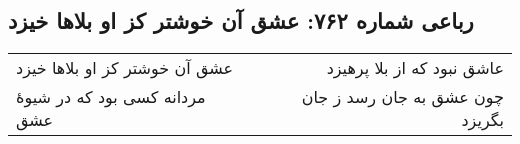 \begin{center}
\section*{رباعی شماره ۷۶۲: عشق آن خوشتر کز او بلاها خیزد}
\label{sec:0762}
\begin{longtable}{l p{0.5cm} r}
عشق آن خوشتر کز او بلاها خیزد
&&
عاشق نبود که از بلا پرهیزد
\\
مردانه کسی بود که در شیوهٔ عشق
&&
چون عشق به جان رسد ز جان بگریزد
\\
\end{longtable}
\end{center}

